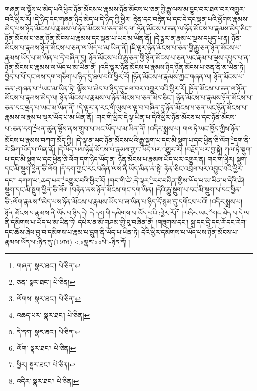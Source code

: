 གཞན་ལ་ལྟོས་པ་མེད་པའི་ཕྱིར་ཉོན་མོངས་པ་རྣམས་ཉོན་མོངས་པ་ཅན་གྱི་རྒྱུ་ལས་མ་བྱུང་བར་ཐལ་བར་འགྱུར་བའི་ཕྱིར་རོ། །དེ་ཉིད་དང་གཞན་ཉིད་མེད་པ་དེ་ཉིད་ཀྱི་ཕྱིར། རྟེན་དང་བརྟེན་པ་དང་དེ་དང་ལྡན་པའི་ཕྱོགས་རྣམས་མེད་པས་ཉོན་མོངས་པ་རྣམས་ལ་ཉོན་མོངས་པ་ཅན་མེད་ལ། ཉོན་མོངས་པ་ཅན་ལ་ཉོན་མོངས་པ་རྣམས་མེད་ཅིང་། ཉོན་མོངས་པ་ཅན་ཉོན་མོངས་པ་རྣམས་དང་ལྡན་པ་ཡང་མ་ཡིན་ནོ། །དེ་ལྟར་ན་རྣམ་པ་ལྔས་དཔྱད་པ་ན། ཉོན་མོངས་པ་རྣམས་ཉོན་མོངས་པ་ཅན་ལ་ཡོད་པ་མ་ཡིན་ནོ། །ཇི་ལྟར་ཉོན་མོངས་པ་ཅན་གྱི་རྒྱུ་ཅན་ཉོན་མོངས་པ་རྣམས་ཡོད་པ་མ་ཡིན་པ་དེ་བཞིན་དུ། ཉོན་མོངས་པའི་རྒྱུ་ཅན་གྱི་ཉོན་མོངས་པ་ཅན་ཡང་རྣམ་པ་ལྔས་དཔྱད་པ་ན་ཉོན་མོངས་པ་རྣམས་ལ་ཡོད་པ་མ་ཡིན་ནོ། །འདི་ལྟར་ཉོན་མོངས་པ་རྣམས་ཉིད་ཉོན་མོངས་པ་ཅན་ནི་མ་ཡིན་ཏེ། བྱེད་པ་པོ་དང་ལས་དག་གཅིག་པ་ཉིད་དུ་ཐལ་བའི་ཕྱིར་རོ། །ཉོན་མོངས་པ་རྣམས་ཀྱང་གཞན་ལ། ཉོན་མོངས་པ་ཅན་:གཞན་པ་\footnote{གཞན་  སྣར་ཐང་།  པེ་ཅིན། }ཡང་མ་ཡིན་ཏེ། ལྟོས་པ་མེད་པ་ཉིད་དུ་ཐལ་བར་འགྱུར་བའི་ཕྱིར་རོ། །ཉོན་མོངས་པ་ཅན་ལ་ཉོན་མོངས་པ་རྣམས་མེད་ལ། ཉོན་མོངས་པ་རྣམས་ལ་ཉོན་མོངས་པ་ཅན་མེད་ཅིང་། ཉོན་མོངས་པ་རྣམས་ཉོན་མོངས་པ་ཅན་དང་ལྡན་པ་ཡང་མ་ཡིན་ནོ། །དེ་ལྟར་ན་རང་གི་ལུས་ལ་ལྟ་བ་བཞིན་དུ་ཉོན་མོངས་པ་ཅན་ཡང་ཉོན་མོངས་པ་རྣམས་ལ་རྣམ་པ་ལྔར་ཡོད་པ་མ་ཡིན་ནོ། །གང་གི་ཕྱིར་དེ་ལྟ་ཡིན་པ་དེའི་ཕྱིར་ཉོན་མོངས་པ་དང་ཉོན་མོངས་པ་:ཅན་དག་\footnote{ཅན་  སྣར་ཐང་།  པེ་ཅིན། }ཕན་ཚུན་ལྟོས་ནས་གྲུབ་པ་ཡང་ཡོད་པ་མ་ཡིན་ནོ། །འདིར་སྨྲས་པ། གལ་ཏེ་ཡང་ཁྱོད་ཀྱིས་ཉོན་མོངས་པ་རྣམས་བཀག་མོད་ཀྱི། །དེ་ལྟ་ན་ཡང་ཉོན་མོངས་པའི་རྒྱུ་སྡུག་པ་དང་མི་སྡུག་པ་དང་ཕྱིན་ཅི་ལོག་\footnote{ལོགས་  སྣར་ཐང་།  པེ་ཅིན། }དག་ནི་རེ་ཞིག་ཡོད་པ་ཡིན་ནོ། །དེ་ཡོད་པས་ཉོན་མོངས་པ་རྣམས་ཀྱང་ཡོད་པར་འགྱུར་རོ། །བརྗོད་པར་བྱ་སྟེ། གལ་ཏེ་སྡུག་པ་དང་མི་སྡུག་པ་དང་ཕྱིན་ཅི་ལོག་དག་ཉིད་ཡོད་ན། ཉོན་མོངས་པ་རྣམས་ཡོད་པར་འགྱུར་ན། གང་གི་ཕྱིར། སྡུག་དང་མི་སྡུག་ཕྱིན་ཅི་ལོག །དེ་དག་ཀྱང་རང་བཞིན་ལས་ནི་ཡོད་མིན་ན་སྟེ། རྟེན་ཅིང་འབྲེལ་པར་འབྱུང་བའི་ཕྱིར་དང་། དགག་པ་:ཆད་པར་\footnote{འཆད་པར་  སྣར་ཐང་།  པེ་ཅིན། }འགྱུར་བའི་ཕྱིར་རོ། །གང་གི་ཚེ་:དེ་ལྟར་\footnote{དེ་དག་  སྣར་ཐང་།  པེ་ཅིན། }རང་བཞིན་གྱིས་ཡོད་པ་མ་ཡིན་པ་དེའི་ཚེ། སྡུག་དང་མི་སྡུག་ཕྱིན་ཅི་ལོག །བརྟེན་ནས་ཉོན་མོངས་གང་དག་ཡིན། །དེའི་རྒྱུ་སྡུག་པ་དང་མི་སྡུག་པ་དང་ཕྱིན་ཅི་:ལོག་རྣམས་\footnote{ལོག་  སྣར་ཐང་།  པེ་ཅིན། }མེད་པས་ཉོན་མོངས་པ་རྣམས་ཡོད་པ་མ་ཡིན་པ་ཉིད་དོ་སྙམ་དུ་དགོངས་པའོ། །འདིར་སྨྲས་པ། ཉོན་མོངས་པ་རྣམས་ནི་ཡོད་པ་ཉིད་དེ། དེ་དག་གི་དམིགས་པ་ཡོད་པའི་:ཕྱིར་རོ།\footnote{ཕྱིར།  སྣར་ཐང་།  པེ་ཅིན། } །:འདིར་ཡང་\footnote{འདིར་  སྣར་ཐང་།  པེ་ཅིན། }གང་མེད་པ་དེ་ལ་ནི་དམིགས་པ་ཡོད་པ་མ་ཡིན་ཏེ། དཔེར་ན་མོ་གཤམ་གྱི་བུ་བཞིན་ནོ། །གཟུགས་དང་། སྒྲ་དང་དྲི་དང་རོ་དང་རེག་དང་ཆོས་ཞེས་བྱ་བ་དམིགས་པ་རྣམ་པ་དྲུག་ནི་ཡོད་པ་ཡིན་ཏེ། དེའི་ཕྱིར་དམིགས་པ་ཡོད་པས་ཉོན་མོངས་པ་རྣམས་ཡོད་པ་:ཉིད་དུ་(1976) <«སྣར་»«པེ་»ཉིད་དོ། །
